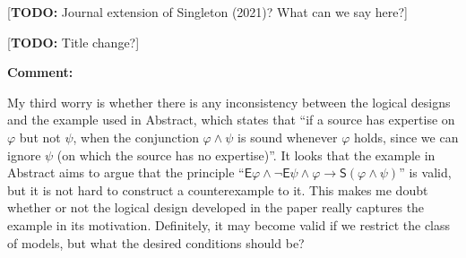\documentclass[12pt]{article}
\newcommand\todo[1]{{\color{red} [\textbf{TODO:} {#1}]}}
\newenvironment{comment}{
    \noindent\textbf{Comment:}\
    \em
}{\vspace{5mm}}
\renewcommand{\phi}{\varphi}
\newcommand{\E}{\mathsf{E}}
\renewcommand{\S}{\mathsf{S}}
\begin{document}
\todo{Journal extension of Singleton (2021)? What can we say here?}

\todo{Title change?}

\begin{comment}
    My third worry is whether there is any inconsistency between the logical
    designs and the example used in Abstract, which states that ``if a source
    has expertise on $\phi$ but not $\psi$, when the conjunction $\phi \land
    \psi$ is sound whenever $\phi$ holds, since we can ignore $\psi$ (on which
    the source has no expertise)''. It looks that the example in Abstract aims
    to argue that the principle ``$\E\phi \land \neg\E\psi \land \phi
    \rightarrow \S(\phi \land \psi)$'' is valid, but it is not hard to
    construct a counterexample to it. This makes me doubt whether or not the
    logical design developed in the paper really captures the example in its
    motivation. Definitely, it may become valid if we restrict the class of
    models, but what the desired conditions should be?
\end{comment}
\end{document}
